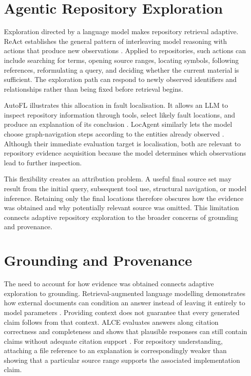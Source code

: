 \section{Agentic Repository Exploration}\label{sec:agentic-repository-exploration}

Exploration directed by a language model makes repository retrieval adaptive. ReAct establishes the general pattern of interleaving model reasoning with actions that produce new observations \textcite{Yao2023ReAct}. Applied to repositories, such actions can include searching for terms, opening source ranges, locating symbols, following references, reformulating a query, and deciding whether the current material is sufficient. The exploration path can respond to newly observed identifiers and relationships rather than being fixed before retrieval begins.

AutoFL illustrates this allocation in fault localisation. It allows an LLM to inspect repository information through tools, select likely fault locations, and produce an explanation of its conclusion \textcite{Kang2024AutoFL}. LocAgent similarly lets the model choose graph-navigation steps according to the entities already observed \textcite{Chen2025LocAgent}. Although their immediate evaluation target is localisation, both are relevant to repository evidence acquisition because the model determines which observations lead to further inspection.

This flexibility creates an attribution problem. A useful final source set may result from the initial query, subsequent tool use, structural navigation, or model inference. Retaining only the final locations therefore obscures how the evidence was obtained and why potentially relevant source was omitted. This limitation connects adaptive repository exploration to the broader concerns of grounding and provenance.

\section{Grounding and Provenance}\label{sec:grounding-and-provenance}

The need to account for how evidence was obtained connects adaptive exploration to grounding. Retrieval-augmented language modelling demonstrates how external documents can condition an answer instead of leaving it entirely to model parameters \textcite{Lewis2020RAG}. Providing context does not guarantee that every generated claim follows from that context. ALCE evaluates answers along citation correctness and completeness and shows that plausible responses can still contain claims without adequate citation support \textcite{Gao2023ALCE}. For repository understanding, attaching a file reference to an explanation is correspondingly weaker than showing that a particular source range supports the associated implementation claim.

